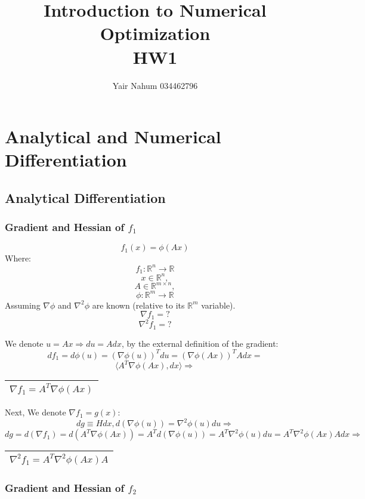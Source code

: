 \documentclass{article}
\title{Introduction to Numerical Optimization\\HW1}
\author{Yair Nahum 034462796 }
\begin{document}
\maketitle


\section{Analytical and Numerical Differentiation}

\subsection{Analytical Differentiation}

\subsubsection{Gradient and Hessian of $f_1$}
$$f_1(x)=\phi(Ax)$$
Where:
$$f_1:\mathbb{R}^n \rightarrow \mathbb{R}$$
$$x \in \mathbb{R}^{n},$$
$$A \in \mathbb{R}^{m\times n},$$
$$\phi:\mathbb{R}^m \rightarrow \mathbb{R}$$
Assuming $\nabla\phi$ and $\nabla^2\phi$ are known (relative to its $\mathbb{R}^m$ variable).
$$\nabla f_1 = ?$$
$$\nabla^2 f_1 = ?$$

We denote $u=Ax \Rightarrow du=Adx$, by the external definition of the gradient:
$$df_1=d\phi(u)=(\nabla\phi(u))^T du = (\nabla\phi(Ax))^T A dx = $$
$$ \langle A^T\nabla \phi(Ax), dx \rangle \Rightarrow $$
\begin{center}
\begin{tabular}{ |c| }
\hline
 $$ \nabla f_1 = A^T\nabla \phi(Ax)$$\\
\hline
\end{tabular}
\end{center}

Next, We denote $\nabla f_1= g(x)$:
$$dg\equiv Hdx,d(\nabla \phi(u)) =  \nabla^2 \phi(u) du \Rightarrow$$
$$dg=d(\nabla f_1) = d(A^T\nabla \phi(Ax))=A^Td(\nabla \phi(u))=A^T\nabla^2 \phi(u) du = A^T\nabla^2 \phi(Ax) A dx \Rightarrow$$
\begin{center}
\begin{tabular}{ |c| }
\hline
$$ \nabla^2 f_1 = A^T\nabla^2 \phi(Ax) A$$\\
\hline
\end{tabular}
\end{center}

\subsubsection{Gradient and Hessian of $f_2$}
\end{document}
